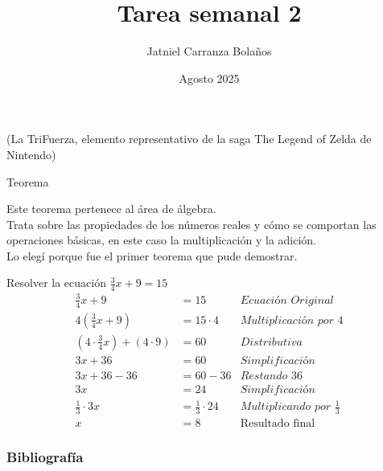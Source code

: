 \documentclass{beamer}
\title{\Huge Tarea semanal 2\\[-1cm]}
\author{Jatniel Carranza Bolaños\\[-0.9cm]}
\date{Agosto 2025}
\begin{document}
    \begin{frame}
        \titlepage
        \vspace{0.5cm}
        \begin{center}
            {\small \textit{\cite{zeldaImg}}(La TriFuerza, elemento representativo de la saga The Legend of Zelda de Nintendo)}
        \end{center}
    \end{frame}
    
    \begin{frame}{Teorema}
        \begin{center}
        \end{center}
          Este teorema pertenece al área de álgebra.\\ 
          Trata sobre las propiedades de los números reales y cómo se comportan las operaciones básicas, en este caso la multiplicación y la adición.\\ 
          Lo elegí porque fue el primer teorema que pude demostrar.
    \end{frame}
    
    \begin{frame}{Resolver la ecuación $\tfrac{3}{4}x+9=15$}
        \begin{align*}
            \tfrac{3}{4}x+9 &= 15 &\textit{Ecuación Original} \\
            4(\tfrac{3}{4}x+9) &= 15 \cdot 4 &\textit{Multiplicación por 4}\\
            (4 \cdot \tfrac{3}{4}x) + (4 \cdot 9) &= 60 &\textit{Distributiva}\\
            3x+36&=60&\textit{Simplificación}\\
            3x+36-36 &=60 -36 & \textit{Restando 36}\\
            3x &=24 & \textit{Simplificación}\\
            \tfrac{1}{3}\cdot3x &=\tfrac{1}{3}\cdot24 & \textit{Multiplicando por $\tfrac{1}{3}$}\\
            x &=8& \text{Resultado final}
        \end{align*}
    \end{frame}
    \begin{frame}[allowframebreaks]
        \frametitle{Bibliografía}
        
        
    \end{frame}


    
\end{document}
